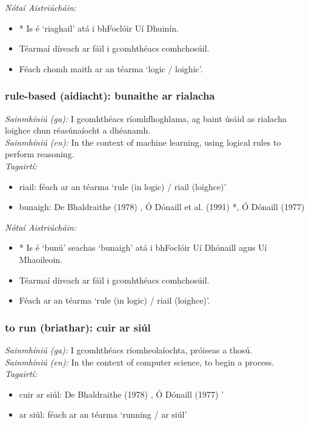  \noindent \textit{Nótaí Aistriúcháin:}
\begin{itemize}
	\item * Is é `riaghail' atá i bhFoclóir Uí Dhuinín.
	\item Téarmaí díreach ar fáil i gcomhthéacs comhchosúil.
	\item Féach chomh maith ar an téarma `logic / loighic'.
\end{itemize}


\subsubsection*{rule-based (aidiacht): bunaithe ar rialacha}
 \noindent \textit{Sainmhíniú (ga):} I gcomhthéacs ríomhfhoghlama, ag baint úsáid as rialacha loighce chun réasúnaíocht a dhéanamh.
\\
 \noindent \textit{Sainmhíniú (en):} In the context of machine learning, using logical rules to perform reasoning.
\\
 \noindent \textit{Tagairtí:}
\begin{itemize}
	\item riail: féach ar an téarma `rule (in logic) / riail (loighce)'
	\item bunaigh: De Bhaldraithe (1978) \cite{de-bhaldraithe}, Ó Dónaill et al. (1991) \cite{focloir-beag}*, Ó Dónaill (1977) \cite{odonaill}
\end{itemize}

 \noindent \textit{Nótaí Aistriúcháin:}
\begin{itemize}
	\item * Is é `bunú' seachas `bunaigh' atá i bhFoclóir Uí Dhónaill agus Uí Mhaoileoin.
	\item Téarmaí díreach ar fáil i gcomhthéacs comhchosúil.
	\item Féach ar an téarma `rule (in logic) / riail (loighce)'.
\end{itemize}


\subsubsection*{to run (briathar): cuir ar siúl}
 \noindent \textit{Sainmhíniú (ga):} I gcomhthéacs ríomheolaíochta, próiseas a thosú.
\\
 \noindent \textit{Sainmhíniú (en):} In the context of computer science, to begin a process.
\\
 \noindent \textit{Tagairtí:}
\begin{itemize}
	\item cuir ar siúl: De Bhaldraithe (1978) \cite{de-bhaldraithe}, Ó Dónaill (1977) \cite{odonaill}'
	\item ar siúl: féach ar an téarma `running / ar siúl'
\end{itemize}

